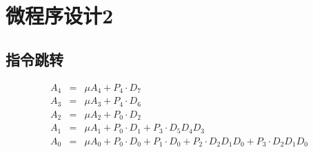 \documentclass[10pt]{book}
\begin{document}
\chapter{微程序设计2}
\section{指令跳转}
\begin{eqnarray}
A_4 &=& \mu A_4+P_4\cdot D_7 \\
A_3 &=& \mu A_3+P_4\cdot D_6 \\
A_2 &=& \mu A_2+P_0\cdot D_2 \\
A_1 &=& \mu A_1+P_0\cdot D_1+P_3\cdot D_5D_4D_3 \\
A_0 &=& \mu A_0+P_0\cdot D_0+P_1\cdot D_0+P_2\cdot D_2D_1D_0+P_3\cdot D_2D_1D_0
\end{eqnarray}
\end{document}
